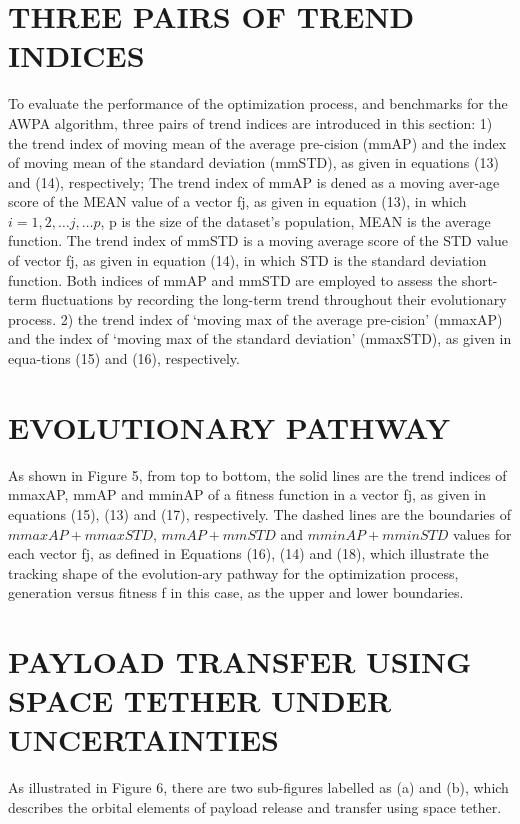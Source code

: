 \documentclass[conference]{IEEEtran}
\begin{document}
\section{THREE PAIRS OF TREND INDICES}

To evaluate the performance of the optimization process, and
benchmarks for the AWPA algorithm, three pairs of trend
indices are introduced in this section:
1) the trend index of moving mean of the average pre-cision (mmAP) and the index of moving mean of the
standard deviation (mmSTD), as given in equations (13)
and (14), respectively;
The trend index of mmAP is dened as a moving aver-age score of the MEAN value of a vector fj, as given in
equation (13), in which $i = 1, 2, \ldots j,\ldots p$, p is the
size of the dataset's population, MEAN is the average
function.
The trend index of mmSTD is a moving average score
of the STD value of vector fj, as given in equation (14),
in which STD is the standard deviation function.
Both indices of mmAP and mmSTD are employed
to assess the short-term fluctuations by recording the
long-term trend throughout their evolutionary process.
2) the trend index of `moving max of the average pre-cision' (mmaxAP) and the index of `moving max of
the standard deviation' (mmaxSTD), as given in equa-tions (15) and (16), respectively.

\section{EVOLUTIONARY PATHWAY}
As shown in Figure 5, from top to bottom, the solid lines
are the trend indices of mmaxAP, mmAP and mminAP of a
fitness function in a vector fj, as given in equations (15), (13)
and (17), respectively.
The dashed lines are the boundaries of $mmaxAP +
mmaxSTD$, $mmAP + mmSTD$ and $mminAP + mminSTD$
values for each vector fj, as defined in Equations (16), (14)
and (18), which illustrate the tracking shape of the evolution-ary pathway for the optimization process, generation versus
fitness f in this case, as the upper and lower boundaries.

\section{PAYLOAD TRANSFER USING SPACE TETHER UNDER
UNCERTAINTIES}
As illustrated in Figure 6, there are two sub-figures labelled
as (a) and (b), which describes the orbital elements of payload
release and transfer using space tether.
\end{document}
